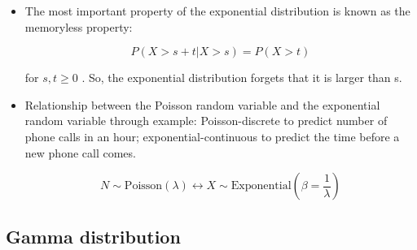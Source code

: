 \documentclass[12pt]{report}
\renewcommand{\_}{\kern-1.5pt\textunderscore\kern-1.5pt}
\begin{document}
\begin{itemize}
\begin{itemize}
	\item The most important property of the exponential distribution is known as the memoryless property:\par

 \[ P \left( X>s+t \vert X>s \right) =P \left( X>t \right)  \] \par

for  \( s,t \geq 0 \) . So, the exponential distribution forgets that it is larger than s. \par

	\item Relationship between the Poisson random variable and the exponential random variable through example: Poisson-discrete to predict number of phone calls in an hour; exponential-continuous to predict the time before a new phone call comes. \par

 \[ N \sim \mathrm{Poisson} \left(  \lambda  \right)   \leftrightarrow X \sim \mathrm{Exponential} \left(  \beta =\frac{1}{ \lambda } \right)  \] \par


\end{itemize}
\end{itemize}\subsection*{Gamma distribution}
\end{document}
